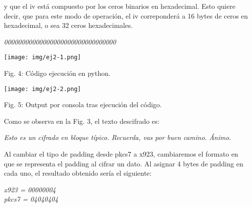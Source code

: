 \documentclass[12pt,oneside,a4paper]{book}
\begin{document}
\vspace{1em}

y que el iv está compuesto por los ceros binarios en hexadecimal. Esto quiere decir, que para este modo de operación, el iv correponderá a 16 bytes de ceros en hexadecimal, o sea 32 ceros hexadecimales.

\vspace{1em}

\begin{center}
    \textit{00000000000000000000000000000000}
\end{center}

\vspace{2em}

\begin{center}
    \texttt{[image: img/ej2-1.png]}
    
\vspace{0.1em}
    
    Fig. 4: Código ejecución en python.
\end{center}

\vspace{2em}

\begin{center}
    \texttt{[image: img/ej2-2.png]}
    
\vspace{0.1em}
    
    Fig. 5: Output por consola tras ejecución del código.
\end{center}

\vspace{2em}

\hspace{20pt}
Como se observa en la Fig. 3, el texto descifrado es:

\vspace{1em}

\begin{center}
    \textit{Esto es un cifrado en bloque típico. Recuerda, vas por buen camino. Ánimo.}
\end{center}

\vspace{1em}

\hspace{20pt}
Al cambiar el tipo de padding desde pkcs7 a x923, cambiaremos el formato en que se representa el padding al cifrar un dato. Al asignar 4 bytes de padding en cada uno, el resultado obtenido sería el siguiente:

\begin{center}
    \textit{x923 = 00000004} \\
    \textit{pkcs7 = 04040404}
\end{center}
\end{document}
